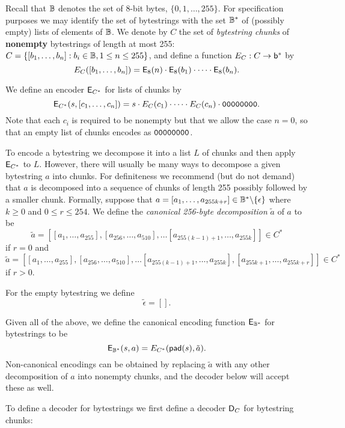 Recall that $\mathbb{B}$ denotes the set of 8-bit bytes, $\{0,1, \ldots, 255\}$. For
specification purposes we may identify the set of bytestrings with the set
$\mathbb{B}^*$ of (possibly empty) lists of elements of $\mathbb{B}$.  We denote by $C$ the set
of \textit{bytestring chunks} of \textbf{nonempty} bytestrings of length at most
255: $C = \{[b_1, \ldots, b_n]: b_i \in \mathbb{B}, 1 \leq n \leq 255\}$, and define a
function $E_C: C \rightarrow \mathsf{b}^*$ by
$$
E_C ([b_1, \ldots, b_n]) = \mathsf{E}_8(n) \cdot \mathsf{E}_8(b_1) \cdot \cdots \cdot \mathsf{E}_8(b_n).
$$

\noindent
We define an encoder $\mathsf{E}_{C^*}$ for lists of chunks by
$$
\mathsf{E}_{C^*} (s, [c_1, \ldots, c_n]) = s \cdot E_C(c_1) \cdot \cdots \cdot E_C(c_n) \cdot \mathtt{00000000}.
$$
\noindent Note that each $c_i$ is required to be nonempty but that we allow the
case $n = 0$, so that an empty list of chunks encodes as $\mathtt{00000000}$.

\medskip
\noindent To encode a bytestring we decompose it into a list $L$ of chunks and
then apply $\mathsf{E}_{C^*}$ to $L$.  However, there will usually be many ways to
decompose a given bytestring $a$ into chunks. For definiteness we recommend (but
do not demand) that $a$ is decomposed into a sequence of chunks of length 255
possibly followed by a smaller chunk.  Formally, suppose that $a = [a_1, \ldots,
  a_{255k+r}] \in \mathbb{B}^*\backslash\{\epsilon\}$ where $k \geq 0$ and $0 \leq r
\leq 254$.  We define the \textit{canonical 256-byte decomposition} $\tilde{a}$ of $a$ to
be
$$
\tilde{a} = [[a_1, \ldots, a_{255}],
  [a_{256}, \ldots, a_{510}],\ldots
  [a_{255(k-1)+1}, \ldots, a_{255k}]] \in C^*
$$
\noindent if $r=0$ and
$$
\tilde{a} = [[a_1, \ldots, a_{255}],
  [a_{256}, \ldots, a_{510}],\ldots
  [a_{255(k-1)+1}, \ldots, a_{255k}], [a_{255k+1}, \ldots, a_{255k+r}]] \in C^*
$$
\noindent if $r>0$.

\smallskip
\noindent For the empty bytestring we define
$$
\tilde{\epsilon} = [].
$$

\medskip
\noindent Given all of the above, we define the canonical encoding function
$\mathsf{E}_{\mathbb{B}^*}$ for bytestrings to be
$$
\mathsf{E}_{\mathbb{B}^*}(s, a) = E_{C^*}(\mathsf{pad}(s), \tilde{a}).
$$
\noindent Non-canonical encodings can be obtained by replacing $\tilde{a}$ with any
other decomposition of $a$ into nonempty chunks, and the decoder below will
accept these as well.

\bigskip

\noindent To define a decoder for bytestrings we first define a decoder
$\mathsf{D}_{C}$ for bytestring chunks:

